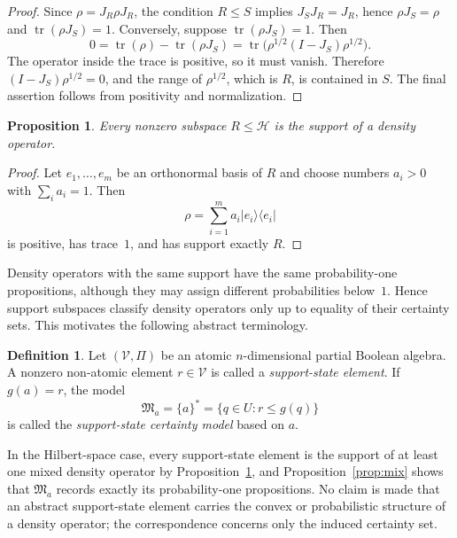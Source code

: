 \documentclass{article}   	%
\theoremstyle{plain}
\newtheorem{proposition}[theorem]{Proposition}
\theoremstyle{definition}
\newtheorem{definition}[theorem]{Definition}
\theoremstyle{remark}
\begin{document}
\begin{proof}
Since $\rho=J_R\rho J_R$, the condition $R\le S$ implies
$J_SJ_R=J_R$, hence $\rho J_S=\rho$ and
$\operatorname{tr}(\rho J_S)=1$.
Conversely, suppose $\operatorname{tr}(\rho J_S)=1$.
Then
\[
0=\operatorname{tr}(\rho)-\operatorname{tr}(\rho J_S)
  =\operatorname{tr}\bigl(\rho^{1/2}(I-J_S)\rho^{1/2}\bigr).
\]
The operator inside the trace is positive, so it must vanish.
Therefore $(I-J_S)\rho^{1/2}=0$, and the range of $\rho^{1/2}$, which is $R$,
is contained in $S$.
The final assertion follows from positivity and normalization.
\end{proof}

\begin{proposition}
\label{prop:everysubspace}
Every nonzero subspace $R\le\mathcal H$ is the support of a density operator.
\end{proposition}

\begin{proof}
Let $e_1,\dots,e_m$ be an orthonormal basis of $R$ and choose numbers
$a_i>0$ with $\sum_i a_i=1$.
Then
\[
\rho=\sum_{i=1}^m a_i|e_i\rangle\langle e_i|
\]
is positive, has trace~$1$, and has support exactly $R$.
\end{proof}

Density operators with the same support have the same probability-one
propositions, although they may assign different probabilities below~$1$.
Hence support subspaces classify density operators only up to equality of their
certainty sets.
This motivates the following abstract terminology.

\begin{definition}
\label{def:absmix}
Let $(\mathcal V,\Pi)$ be an atomic $n$-dimensional partial Boolean algebra.
A nonzero non-atomic element $r\in\mathcal V$ is called a \emph{support-state
element}.
If $g(a)=r$, the model
\[
\mathfrak M_a=\{a\}^*=\{q\in U:r\le g(q)\}
\]
is called the \emph{support-state certainty model} based on $a$.
\end{definition}

In the Hilbert-space case, every support-state element is the support of at least
one mixed density operator by Proposition~\ref{prop:everysubspace}, and
Proposition~\ref{prop:mix} shows that $\mathfrak M_a$ records exactly its
probability-one propositions.
No claim is made that an abstract support-state element carries the convex or
probabilistic structure of a density operator; the correspondence concerns only
the induced certainty set.


\end{document}
